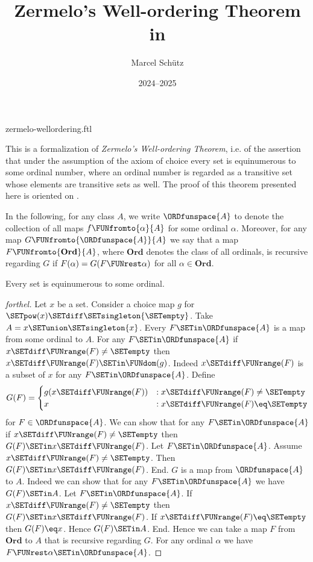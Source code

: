 \documentclass{article}
\title{Zermelo's Well-ordering Theorem in \Naproche}
\author{Marcel Schütz}
\date{2024--2025}
\newcommand\Ord{\textbf{Ord}}
\begin{document}
\begin{smodule}{zermelo-wellordering.ftl}
\maketitle


\noindent This is a formalization of \textit{Zermelo's Well-ordering Theorem},
i.e. of the assertion that under the assumption of the axiom of choice every
set is equinumerous to some ordinal number, where an ordinal number is
regarded as a transitive set whose elements are transitive sets as well.
The proof of this theorem presented here is oriented on \cite{Koepke2018}.

In the following, for any class $A$, we write $\ORDfunspace{A}$ to
denote the collection of all maps $f \FUNfromto{\alpha}{A}$ for some ordinal
$\alpha$.
Moreover, for any map $G \FUNfromto{\ORDfunspace{A}}{A}$ we say that a map
$F \FUNfromto{\Ord}{A}$, where $\Ord$ denotes the class of all ordinals, is
recursive regarding $G$ if $F(\alpha) = G(F \FUNrest \alpha)$ for all
$\alpha \in \Ord$.

\begin{theorem}[forthel,title=Zermelo's Well-Ordering Theorem,id=zermelo]
  Every set is equinumerous to some ordinal.
\end{theorem}
\begin{proof}[forthel]
  Let $x$ be a set.
  Consider a choice map $g$ for $\SETpow(x) \SETdiff \SETsingleton{\SETempty}$.
  Take $A = x \SETunion \SETsingleton{x}$.
  Every $F \SETin \ORDfunspace{A}$ is a map from some ordinal to $A$.
  For any $F \SETin \ORDfunspace{A}$ if $x \SETdiff \FUNrange(F) \neq \SETempty$ then $x \SETdiff \FUNrange(F) \SETin \FUNdom(g)$.
  Indeed $x \SETdiff \FUNrange(F)$ is a subset of $x$ for any $F \SETin \ORDfunspace{A}$.
  Define \[ G(F) =
    \begin{cases}
      g(x \SETdiff \FUNrange(F))
      & : x \SETdiff \FUNrange(F) \neq \SETempty
      \\
      x
      & : x \SETdiff \FUNrange(F) \eq \SETempty
    \end{cases} \]
  for $F \in \ORDfunspace{A}$.
  We can show that for any $F \SETin \ORDfunspace{A}$ if $x \SETdiff \FUNrange(F) \neq \SETempty$ then $G(F) \SETin x \SETdiff \FUNrange(F)$.
    Let $F \SETin \ORDfunspace{A}$.
    Assume $x \SETdiff \FUNrange(F) \neq \SETempty$.  
    Then $G(F) \SETin x \SETdiff \FUNrange(F)$.
  End.
  $G$ is a map from $\ORDfunspace{A}$ to $A$.
  Indeed we can show that for any $F \SETin \ORDfunspace{A}$ we have $G(F) \SETin A$.
    Let $F \SETin \ORDfunspace{A}$.
    If $x \SETdiff \FUNrange(F) \neq \SETempty$ then $G(F) \SETin x \SETdiff \FUNrange(F)$.
    If $x \SETdiff \FUNrange(F) \eq \SETempty$ then $G(F) \eq x$.
    Hence $G(F) \SETin A$.
  End.
  Hence we can take a map $F$ from $\Ord$ to $A$ that is recursive regarding $G$.
  For any ordinal $\alpha$ we have $F \FUNrest \alpha \SETin \ORDfunspace{A}$.


\end{proof}
\end{smodule}
\end{document}
